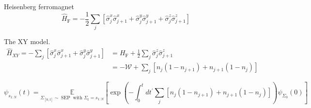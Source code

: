 Heisenberg ferromagnet
\begin{equation}
\hat H_{\mathrm{F}}=-\frac{1}{2} \sum_{j}\left[\hat{\sigma}_{j}^{x} \hat{\sigma}_{j+1}^{x}+\hat{\sigma}_{j}^{y} \hat{\sigma}_{j+1}^{y}+\hat{\sigma}_{j}^{z} \hat{\sigma}_{j+1}^{z}\right]
\end{equation}

The XY model.
\begin{equation}
\begin{aligned} 
\hat H_{X Y}=-\sum_{j}\left[\hat{\sigma}_{j}^{x} \hat{\sigma}_{j+1}^{x}+\hat{\sigma}_{j}^{y} \hat{\sigma}_{j+1}^{y}\right] &=H_{\mathrm{F}}+\frac{1}{2} \sum_{j} \hat{\sigma}_{j}^{z} \hat{\sigma}_{j+1}^{z} \\ 						&=-\mathcal{W}+\sum_{j}\left[n_{j}\left(1-n_{j+1}\right)+n_{j+1}\left(1-n_{j}\right)\right] 
\end{aligned}
\end{equation}

\begin{equation}
\psi_{s_{1: N}}(t)=\underset{\Sigma_{[0, t]} \sim \operatorname{SEP} \text{ with } \Sigma_{t}=s_{1: N}}{\mathbb{E}}
\left[\exp \left(-\int_{0}^{t} d t^{\prime} \sum_{j}\left[n_{j}\left(1-n_{j+1}\right)+n_{j+1}\left(1-n_{j}\right)\right]\right) \psi_{\Sigma_{0}}(0)\right]
\end{equation}


